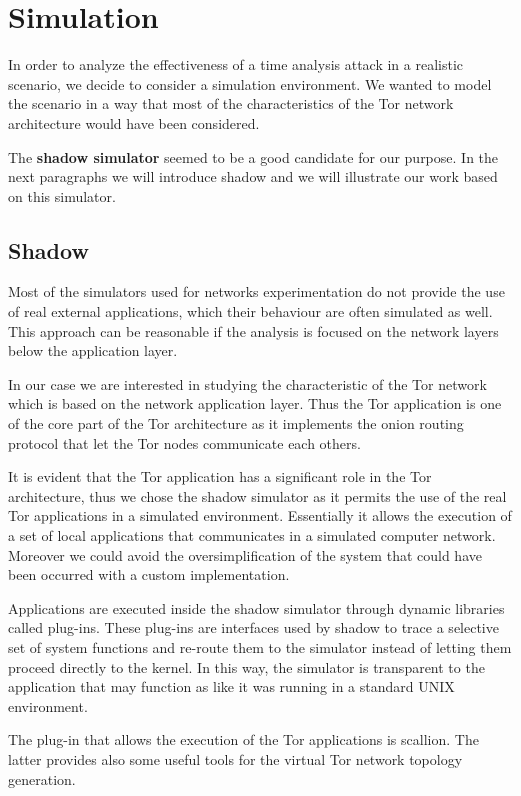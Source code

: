 \section{Simulation}
\label{sec:simulation}
In order to analyze the effectiveness of a time analysis attack in a
realistic scenario, we decide to consider a simulation environment.
We wanted to model the scenario in a way that most of the
characteristics of the Tor network architecture would have been
considered.

The \textbf{shadow simulator}\cite{shadow} seemed to be a good candidate for our purpose. In
the next paragraphs we will introduce shadow and we will illustrate our
work based on this simulator.
 
\subsection{Shadow}
Most of the simulators used for networks experimentation do not provide
the use of real external applications, which their
behaviour are often simulated as well. 
This approach can be reasonable if the analysis is focused on the 
network layers below the application layer. 

In our case we are interested in studying the characteristic of the Tor
network which is based on the network application layer.
Thus the Tor application is one of the core part of the Tor architecture as it implements the
onion routing protocol that let the Tor nodes communicate each others.

It is evident that the Tor application has a significant role in
the Tor architecture, thus we chose the shadow simulator as it permits
the use of the real Tor applications in a simulated environment.
Essentially it allows the execution of a set of local applications that
communicates in a simulated computer network. Moreover we could
avoid the oversimplification of the system that could have been occurred
with a custom implementation.

Applications are executed inside the shadow simulator through 
dynamic libraries called plug-ins. 
These plug-ins are interfaces used by shadow to trace a
selective set of system functions and re-route them to the simulator instead
of letting them proceed directly to the kernel. 
In this way, the simulator is transparent to the application
that may function as like it was running in a standard UNIX environment. 

The plug-in that allows the execution of the Tor applications is
scallion. The latter provides also some useful tools for the virtual
Tor network topology generation.

